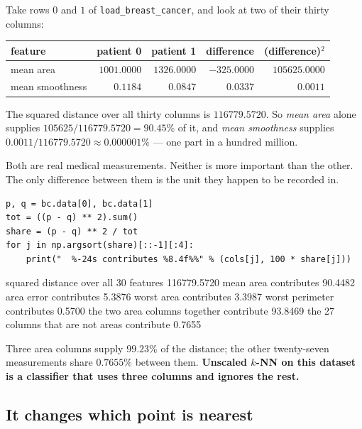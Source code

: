 \documentclass[11pt]{article}
\begin{document}
\begin{worked}
Take rows $0$ and $1$ of \texttt{load\_breast\_cancer}, and look at two of
their thirty columns:

\begin{center}\small
\begin{tabular}{@{}lrrrr@{}}
\toprule
feature & patient 0 & patient 1 & difference & (difference)$^2$\\
\midrule
mean area & $1001.0000$ & $1326.0000$ & $-325.0000$ & $105625.0000$\\
mean smoothness & $0.1184$ & $0.0847$ & $0.0337$ & $0.0011$\\
\bottomrule
\end{tabular}
\end{center}

The squared distance over all thirty columns is $116779.5720$. So
\emph{mean area} alone supplies $105625 / 116779.5720 = 90.45\%$ of it, and
\emph{mean smoothness} supplies $0.0011 / 116779.5720 \approx
0.000001\%$ --- one part in a hundred million.

Both are real medical measurements. Neither is more important than the other.
The only difference between them is the unit they happen to be recorded in.
\end{worked}

\begin{lstlisting}
p, q = bc.data[0], bc.data[1]
tot = ((p - q) ** 2).sum()
share = (p - q) ** 2 / tot
for j in np.argsort(share)[::-1][:4]:
    print("  %-24s contributes %8.4f%%" % (cols[j], 100 * share[j]))
\end{lstlisting}
\begin{codeout}
squared distance over all 30 features 116779.5720
  mean area                contributes  90.4482%
  area error               contributes   5.3876%
  worst area               contributes   3.3987%
  worst perimeter          contributes   0.5700%
the two area columns together contribute 93.8469%
the 27 columns that are not areas contribute 0.7655%
\end{codeout}

Three area columns supply $99.23\%$ of the distance; the other twenty-seven
measurements share $0.7655\%$ between them. \textbf{Unscaled $k$-NN on this
dataset is a classifier that uses three columns and ignores the rest.}

\subsection{It changes which point is nearest}
\end{document}

